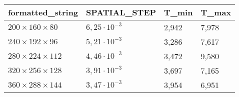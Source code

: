 \begin{tabular}{llll}
\toprule
formatted_string & SPATIAL_STEP & T_min & T_max \\
\midrule
$200 \times 160 \times 80$  & $6,25 \cdot  10^{-3}$ & 2,942 & 7,978 \\
$240 \times 192 \times 96$  & $5,21 \cdot  10^{-3}$ & 3,286 & 7,617 \\
$280 \times 224 \times 112$  & $4,46 \cdot  10^{-3}$ & 3,472 & 9,580 \\
$320 \times 256 \times 128$  & $3,91 \cdot  10^{-3}$ & 3,697 & 7,165 \\
$360 \times 288 \times 144$  & $3,47 \cdot  10^{-3}$ & 3,954 & 6,951 \\
\bottomrule
\end{tabular}
